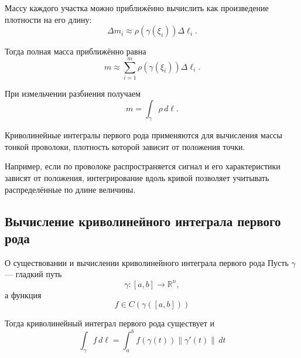 \documentclass[12pt,a4paper]{article}
\begin{document}
Массу каждого участка можно приближённо вычислить как произведение плотности на его длину:
\[
\Delta m_i\approx
\rho(\gamma(\xi_i))\Delta\ell_i.
\]

Тогда полная масса приближённо равна
\[
m\approx
\sum_{i=1}^{m}
\rho(\gamma(\xi_i))\Delta\ell_i.
\]

При измельчении разбиения получаем
\[
\boxed{
m=\int_\gamma\rho\,d\ell.
}
\]

\begin{example}
Криволинейные интегралы первого рода применяются для вычисления массы тонкой проволоки, плотность которой зависит от положения точки.

Например, если по проволоке распространяется сигнал и его характеристики зависят от положения, интегрирование вдоль кривой позволяет учитывать распределённые по длине величины.
\end{example}

\subsection{Вычисление криволинейного интеграла первого рода}

\begin{theorem}{О существовании и вычислении криволинейного интеграла первого рода}
Пусть $\gamma$ — гладкий путь
\[
\gamma:[a,b]\to\mathbb{R}^n,
\]
а функция
\[
f\in C(\gamma([a,b]))
\]

Тогда криволинейный интеграл первого рода существует и
\[
\int_\gamma f\,d\ell
=
\int_a^b
f(\gamma(t))\|\gamma'(t)\|\,dt
\]
\end{theorem}
\end{document}
